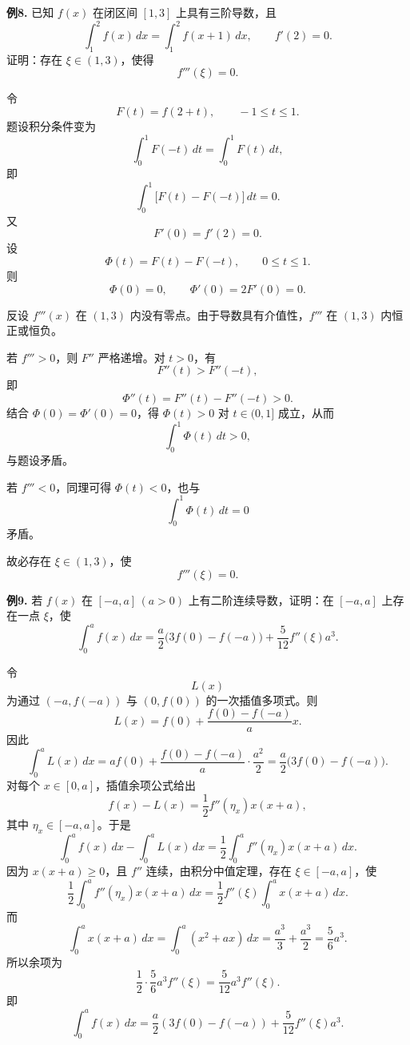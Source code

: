 \begin{problemblock}
\textbf{例8.} 已知 \(f(x)\) 在闭区间 \([1,3]\) 上具有三阶导数，且
\[
\int_1^2 f(x)\,dx=\int_1^2 f(x+1)\,dx,\qquad f'(2)=0.
\]
证明：存在 \(\xi\in(1,3)\)，使得
\[
f'''(\xi)=0.
\]
\end{problemblock}
\begin{solutionblock}
令
\[
F(t)=f(2+t),\qquad -1\le t\le1.
\]
题设积分条件变为
\[
\int_0^1 F(-t)\,dt=\int_0^1 F(t)\,dt,
\]
即
\[
\int_0^1\bigl[F(t)-F(-t)\bigr]\,dt=0.
\]
又
\[
F'(0)=f'(2)=0.
\]
设
\[
\Phi(t)=F(t)-F(-t),\qquad 0\le t\le1.
\]
则
\[
\Phi(0)=0,\qquad \Phi'(0)=2F'(0)=0.
\]

反设 \(f'''(x)\) 在 \((1,3)\) 内没有零点。由于导数具有介值性，\(f'''\) 在 \((1,3)\) 内恒正或恒负。

若 \(f'''>0\)，则 \(F''\) 严格递增。对 \(t>0\)，有
\[
F''(t)>F''(-t),
\]
即
\[
\Phi''(t)=F''(t)-F''(-t)>0.
\]
结合 \(\Phi(0)=\Phi'(0)=0\)，得 \(\Phi(t)>0\) 对 \(t\in(0,1]\) 成立，从而
\[
\int_0^1\Phi(t)\,dt>0,
\]
与题设矛盾。

若 \(f'''<0\)，同理可得 \(\Phi(t)<0\)，也与
\[
\int_0^1\Phi(t)\,dt=0
\]
矛盾。

故必存在 \(\xi\in(1,3)\)，使
\[
f'''(\xi)=0.
\]
\end{solutionblock}

\begin{problemblock}
\textbf{例9.} 若 \(f(x)\) 在 \([-a,a]\,(a>0)\) 上有二阶连续导数，证明：在 \([-a,a]\) 上存在一点 \(\xi\)，使
\[
\int_0^a f(x)\,dx
=\frac a2\bigl(3f(0)-f(-a)\bigr)
+\frac5{12}f''(\xi)a^3.
\]
\end{problemblock}
\begin{solutionblock}
令
\[
L(x)
\]
为通过 \((-a,f(-a))\) 与 \((0,f(0))\) 的一次插值多项式。则
\[
L(x)=f(0)+\frac{f(0)-f(-a)}{a}x.
\]
因此
\[
\int_0^a L(x)\,dx
=af(0)+\frac{f(0)-f(-a)}{a}\cdot\frac{a^2}{2}
=\frac a2\bigl(3f(0)-f(-a)\bigr).
\]
对每个 \(x\in[0,a]\)，插值余项公式给出
\[
f(x)-L(x)=\frac12 f''(\eta_x)x(x+a),
\]
其中 \(\eta_x\in[-a,a]\)。于是
\[
\int_0^a f(x)\,dx-\int_0^a L(x)\,dx
=\frac12\int_0^a f''(\eta_x)x(x+a)\,dx.
\]
因为 \(x(x+a)\ge0\)，且 \(f''\) 连续，由积分中值定理，存在 \(\xi\in[-a,a]\)，使
\[
\frac12\int_0^a f''(\eta_x)x(x+a)\,dx
=\frac12 f''(\xi)\int_0^a x(x+a)\,dx.
\]
而
\[
\int_0^a x(x+a)\,dx=\int_0^a(x^2+ax)\,dx
=\frac{a^3}{3}+\frac{a^3}{2}
=\frac56a^3.
\]
所以余项为
\[
\frac12\cdot\frac56a^3 f''(\xi)=\frac5{12}a^3f''(\xi).
\]
即
\[
\int_0^a f(x)\,dx
=\frac a2(3f(0)-f(-a))+\frac5{12}f''(\xi)a^3.
\]
\end{solutionblock}

